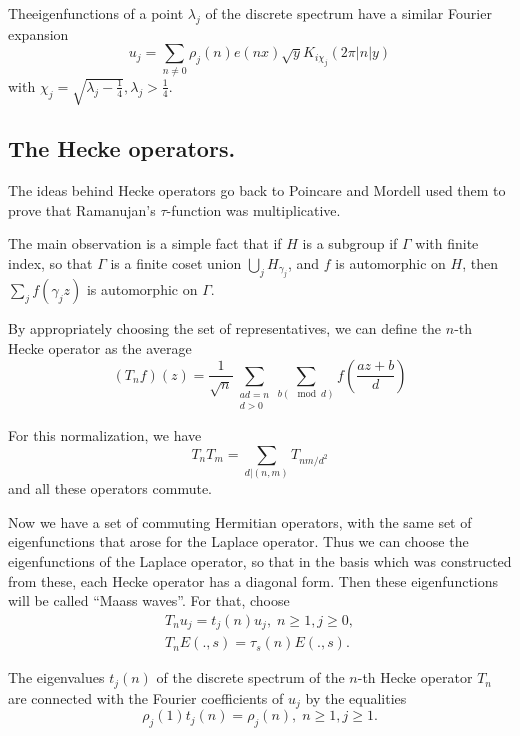 The\pageoriginale eigenfunctions of a point $\lambda_j$ of the discrete spectrum have a similar Fourier expansion
\begin{equation}
u_j = \sum\limits_{n \neq 0} \rho_j (n) e (nx) \sqrt{y} K_{i\chi_j} (2\pi|n| y) \label{art7-eq1.17}
\end{equation}
with $\chi_j = \sqrt{\lambda_j -\frac{1}{4}}, \lambda_j > \frac{1}{4}$.

\subsection{The Hecke operators.}\label{art7-subsec1.4}
The ideas behind Hecke operators go back to Poincare and Mordell used them to prove that Ramanujan's $\tau$-function was multiplicative.

The main observation is a simple fact that if $H$ is a subgroup if $\Gamma$ with finite index, so that $\Gamma$ is a finite coset union $\bigcup\limits_j H_{\gamma_j}$, and $f$ is automorphic on $H$, then $\sum\limits_j f(\gamma_jz)$ is automorphic on $\Gamma$.

By appropriately choosing the set of representatives, we can define the $n$-th Hecke operator as the average
\begin{equation}
(T_n f) (z) = \frac{1}{\sqrt{n}} \sum\limits_{\substack{ad =n\\d>0}} \sum\limits_{b(\mod d)} f \left(\frac{az+b}{d} \right)
\label{art7-eq1.18}
\end{equation}

For this normalization, we have
\begin{equation}
T_n T_m = \sum\limits_{d|(n, m)} T_{nm/d^2} \label{art7-eq1.19}
\end{equation}
and all these operators commute.

Now we have a set of commuting Hermitian operators, with the same set of eigenfunctions that arose for the Laplace operator. Thus we can choose the eigenfunctions of the Laplace operator, so that in the basis which was constructed from these, each Hecke operator has a diagonal form. Then these eigenfunctions will be called ``Maass waves''. For that, choose 
\begin{gather}
T_n u_j  = t_j (n) u_j, \; n \geqslant 1, j\geqslant 0,\label{art7-eq1.20}\\
T_n E (.,s) = \tau_s (n) E(., s).\label{art7-eq1.21}
\end{gather}

The eigenvalues $t_j(n)$ of the discrete spectrum of the $n$-th Hecke operator $T_n$ are connected with the Fourier coefficients of $u_j$ by the equalities 
\begin{equation}
\rho_j (1) t_j (n) = \rho_j(n), \; n \geqslant 1, j \geqslant 1. \label{art7-eq1.22}
\end{equation}


